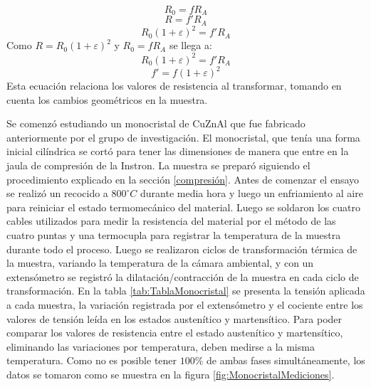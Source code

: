 \documentclass[a4paper,12pt,fleqn,twoside,openany]{book}
\begin{document}
\begin{equation}
 R_0=fR_A 
\end{equation}
\begin{equation}
 R=f'R_A
\end{equation}
\begin{equation}
 R_0 (1+\varepsilon)^2 = f'R_A
\end{equation}
Como $R=R_0 (1+\varepsilon)^2$ y $R_0=fR_A$ se llega a:
\begin{equation}
 R_0 (1+\varepsilon)^2 = f'R_A
\end{equation}
\begin{equation}
f' = f (1+\varepsilon)^2  \label{fprima}
\end{equation}
Esta ecuación relaciona los valores de resistencia al transformar, tomando en cuenta los cambios geométricos en la muestra.




Se comenzó estudiando un monocristal de CuZnAl que fue fabricado anteriormente por el grupo de investigación. El monocristal, que tenía una forma inicial cilíndrica se cortó para tener las dimensiones de manera que entre en la jaula de compresión de la Instron. La muestra se preparó siguiendo el procedimiento explicado en la sección \ref{compresión}. Antes de comenzar el ensayo se realizó un recocido a $800 ^\circ C$ durante media hora y luego un enfriamiento al aire para reiniciar el estado termomecánico del material. Luego se soldaron los cuatro cables utilizados para medir la resistencia del material por el método de las cuatro puntas y una termocupla para registrar la temperatura de la muestra durante todo el proceso. Luego se realizaron ciclos de transformación térmica de la muestra, variando la temperatura de la cámara ambiental, y con un extensómetro se registró la dilatación/contracción de la muestra en cada ciclo de transformación. En la tabla \ref{tab:TablaMonocristal} se presenta la tensión aplicada a cada muestra, la variación registrada por el extensómetro y el cociente entre los valores de tensión leída en los estados austenítico y martensítico. 
Para poder comparar los valores de resistencia entre el estado austenítico y martensítico, eliminando las variaciones por temperatura, deben medirse a la misma temperatura. Como no es posible tener $100 \%$ de ambas fases simultáneamente, los datos se tomaron como se muestra en la figura \ref{fig:MonocristalMediciones}.
  
\end{document}
